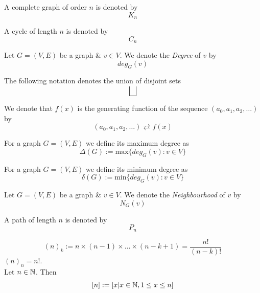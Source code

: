 \documentclass[11pt,a4paper]{article}
\begin{document}
A complete graph of order $n$ is denoted by
$$K_n$$

A cycle of length $n$ is denoted by $$C_n$$

Let $G=(V,E)$ be a graph \& $v\in V$. We denote the \textit{Degree} of $v$ by
$$deg_G(v)$$

The following notation denotes the union of disjoint sets
$$\bigsqcup$$

We denote that $f(x)$ is the generating function of the sequence $(a_0,a_1,a_2,\dots)$ by
$$(a_0,a_1,a_2,\dots)\rightleftarrows f(x)$$

For a graph $G=(V,E)$ we define its maximum degree as
$$\Delta(G):=\mathrm{max}\{deg_G(v):v\in V\}$$

For a graph $G=(V,E)$ we define its minimum degree as
$$\delta(G):=\mathrm{min}\{deg_G(v):v\in V\}$$

Let $G=(V,E)$ be a graph \& $v\in V$. We denote the \textit{Neighbourhood} of $v$ by
$$N_G(v)$$

A path of length $n$ is denoted by $$P_n$$

$$(n)_k:=n\times(n-1)\times\dots\times(n-k+1)=\dfrac{n!}{(n-k)!}$$
\nb $(n)_n=n!$.\\

Let $n\in\mathbb{N}$. Then
$$[n]:=[x|x\in\mathbb{N}, 1\leq x\leq n]$$
\end{document}

